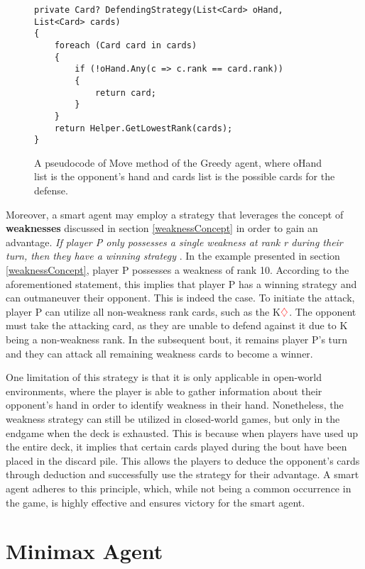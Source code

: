 \begin{figure}[h]
\captionsetup{justification=centering}
\begin{lstlisting}
private Card? DefendingStrategy(List<Card> oHand, List<Card> cards)
{
	foreach (Card card in cards)
	{
		if (!oHand.Any(c => c.rank == card.rank))
		{
			return card;
		}
	}
	return Helper.GetLowestRank(cards);
}
\end{lstlisting}
\caption{A pseudocode of Move method of the Greedy agent, where oHand list is the opponent's hand and cards list is the possible cards for the defense.}
\label{fig:defStratSmart}
\end{figure}

Moreover, a smart agent may employ a strategy that leverages the concept of \textbf{weaknesses} discussed in section \ref{weaknessConcept} in order to gain an advantage. \textit{If player P only possesses a single weakness at rank r during their turn, then they have a winning strategy} \citep{Bonnet2016TheCO}. In the example presented in section \ref{weaknessConcept}, player P possesses a weakness of rank 10. According to the aforementioned statement, this implies that player P has a winning strategy and can outmaneuver their opponent. This is indeed the case. To initiate the attack, player P can utilize all non-weakness rank cards, such as the K$\textcolor{red}{\diamondsuit}$. The opponent must take the attacking card, as they are unable to defend against it due to K being a non-weakness rank. In the subsequent bout, it remains player P's turn and they can attack all remaining weakness cards to become a winner.

One limitation of this strategy is that it is only applicable in open-world environments, where the player is able to gather information about their opponent's hand in order to identify weakness in their hand.  Nonetheless, the weakness strategy can still be utilized in closed-world games, but only in the endgame when the deck is exhausted. This is because when players have used up the entire deck, it implies that certain cards played during the bout have been placed in the discard pile. This allows the players to deduce the opponent's cards through deduction and successfully use the strategy for their advantage. A smart agent adheres to this principle, which, while not being a common occurrence in the game, is highly effective and ensures victory for the smart agent.

\section{Minimax Agent}
\label{minimax}

